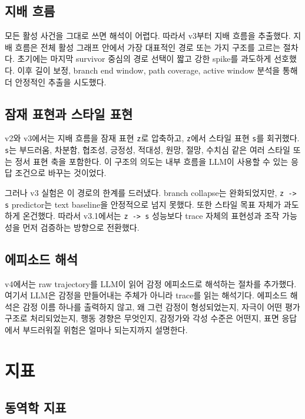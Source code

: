 \documentclass[11pt,a4paper]{article}
\newcommand{\eng}[1]{\texttt{#1}}
\begin{document}
\subsection{지배 흐름}

모든 활성 사건을 그대로 쓰면 해석이 어렵다. 따라서 v3부터 지배 흐름을 추출했다. 지배 흐름은 전체 활성 그래프 안에서 가장 대표적인 경로 또는 가지 구조를 고르는 절차다. 초기에는 마지막 survivor 중심의 경로 선택이 짧고 강한 spike를 과도하게 선호했다. 이후 길이 보정, branch end window, path coverage, active window 분석을 통해 더 안정적인 추출을 시도했다.

\subsection{잠재 표현과 스타일 표현}

v2와 v3에서는 지배 흐름을 잠재 표현 \eng{z}로 압축하고, \eng{z}에서 스타일 표현 \eng{s}를 회귀했다. \eng{s}는 부드러움, 차분함, 협조성, 긍정성, 적대성, 원망, 절망, 수치심 같은 여러 스타일 또는 정서 표현 축을 포함한다. 이 구조의 의도는 내부 흐름을 LLM이 사용할 수 있는 응답 조건으로 바꾸는 것이었다.

그러나 v3 실험은 이 경로의 한계를 드러냈다. branch collapse는 완화되었지만, \eng{z -> s} predictor는 text baseline을 안정적으로 넘지 못했다. 또한 스타일 목표 자체가 과도하게 온건했다. 따라서 v3.1에서는 \eng{z -> s} 성능보다 trace 자체의 표현성과 조작 가능성을 먼저 검증하는 방향으로 전환했다.

\subsection{에피소드 해석}

v4에서는 raw trajectory를 LLM이 읽어 감정 에피소드로 해석하는 절차를 추가했다. 여기서 LLM은 감정을 만들어내는 주체가 아니라 trace를 읽는 해석기다. 에피소드 해석은 감정 이름 하나를 출력하지 않고, 왜 그런 감정이 형성되었는지, 자극이 어떤 평가 구조로 처리되었는지, 행동 경향은 무엇인지, 감정가와 각성 수준은 어떤지, 표면 응답에서 부드러워질 위험은 얼마나 되는지까지 설명한다.

\section{지표}

\subsection{동역학 지표}
\end{document}
